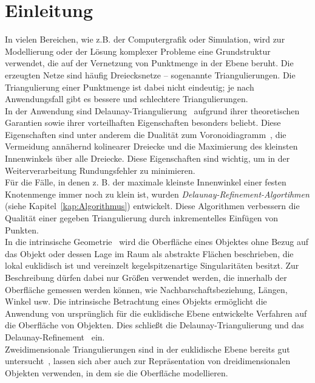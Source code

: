 \chapter{ Einleitung}


In vielen Bereichen, wie z.B. der Computergrafik oder Simulation, wird zur Modellierung oder der Lösung komplexer Probleme eine  Grundstruktur verwendet, die auf der Vernetzung von Punktmenge in der Ebene beruht. Die erzeugten Netze sind häufig Dreiecksnetze -- sogenannte  Triangulierungen.
Die Triangulierung einer Punktmenge ist dabei nicht eindeutig; je nach Anwendungsfall gibt es bessere und schlechtere Triangulierungen.\\ 
In der Anwendung  sind Delaunay-Triangulierung~\cite{lee:1986:DelaunayTriangulation} aufgrund  ihrer theoretischen Garantien sowie ihrer  vorteilhaften Eigenschaften besonders beliebt. Diese Eigenschaften sind unter anderem die Dualität zum Voronoidiagramm~\cite{aurenhammer:2000:voronoi}, die Vermeidung annähernd kolinearer Dreiecke und die Maximierung  des kleinsten Innenwinkels über alle Dreiecke. Diese Eigenschaften sind wichtig, um in der Weiterverarbeitung Rundungsfehler zu minimieren.\\
Für die Fälle, in denen z. B. der maximale kleinste Innenwinkel einer festen Knotenmenge immer noch zu klein ist, wurden \textit{Delaunay-Refinement-Algortihmen} (siehe Kapitel~\ref{kap:Algorithmus}) entwickelt. Diese Algorithmen verbessern die Qualität einer gegeben Triangulierung  durch inkrementelles Einfügen von Punkten. \\

In die intrinsische Geometrie~\cite{Bobenko:2006:SIGGRAPH,Bobenko:2007:LaplaceBeltrami} wird die Oberfläche eines Objektes ohne Bezug auf das Objekt oder dessen Lage im Raum als abstrakte Flächen beschrieben,  die lokal euklidisch ist und vereinzelt kegelspitzenartige Singularitäten besitzt. Zur Beschreibung dürfen dabei nur Größen verwendet werden, die  innerhalb der Oberfläche gemessen werden können, wie Nachbarschaftsbeziehung, Längen, Winkel usw. Die intrinsische Betrachtung eines Objekts ermöglicht die Anwendung von ursprünglich für die euklidische Ebene entwickelte Verfahren auf die Oberfläche von Objekten. Dies schließt die Delaunay-Triangulierung  \cite{Bobenko:2006:SIGGRAPH} und das Delaunay-Refinement~\cite{Sharp:2019:NIT} ein. \\

Zweidimensionale Triangulierungen sind in  der euklidische Ebene bereits gut untersucht~\cite{SHEWCHUK:2002:chuws}, lassen sich aber auch zur Repräsentation von dreidimensionalen Objekten verwenden, in dem sie die Oberfläche modellieren.\\ 

